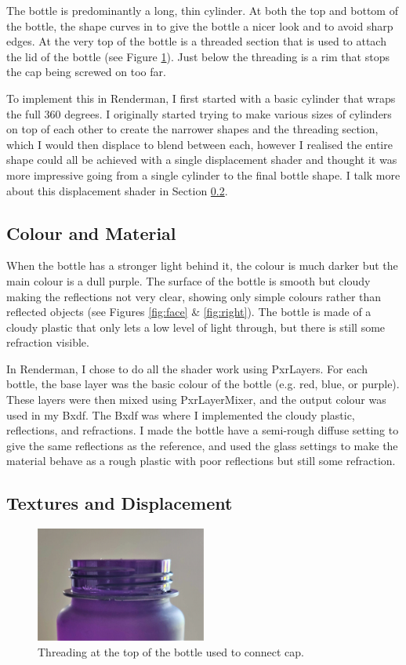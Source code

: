 \documentclass[notitlepage,12pt]{article}
\begin{document}
The bottle is predominantly a long, thin cylinder. At both the top and bottom of the bottle, the shape curves in to give the bottle a nicer look and to avoid sharp edges. At the very top of the bottle is a threaded section that is used to attach the lid of the bottle (see Figure \ref{fig:thread}). Just below the threading is a rim that stops the cap being screwed on too far.

To implement this in Renderman, I first started with a basic cylinder that wraps the full 360 degrees. I originally started trying to make various sizes of cylinders on top of each other to create the narrower shapes and the threading section, which I would then displace to blend between each, however I realised the entire shape could all be achieved with a single displacement shader and thought it was more impressive going from a single cylinder to the final bottle shape. I talk more about this displacement shader in Section \ref{section:tex_displace}.

\subsection{Colour and Material}

When the bottle has a stronger light behind it, the colour is much darker but the main colour is a dull purple. The surface of the bottle is smooth but cloudy making the reflections not very clear, showing only simple colours rather than reflected objects (see Figures \ref{fig:face} \& \ref{fig:right}). The bottle is made of a cloudy plastic that only lets a low level of light through, but there is still some refraction visible.

In Renderman, I chose to do all the shader work using PxrLayers. For each bottle, the base layer was the basic colour of the bottle (e.g. red, blue, or purple). These layers were then mixed using PxrLayerMixer, and the output colour was used in my Bxdf. The Bxdf was where I implemented the cloudy plastic, reflections, and refractions. I made the bottle have a semi-rough diffuse setting to give the same reflections as the reference, and used the glass settings to make the material behave as a rough plastic with poor reflections but still some refraction.

\subsection{Textures and Displacement} \label{section:tex_displace}

\begin{figure}[ht]
    \centering
    \includegraphics[width=0.5\textwidth]{reference/bottle_thread.jpg}
    \caption{Threading at the top of the bottle used to connect cap.}
    \label{fig:thread}
\end{figure}
\end{document}
